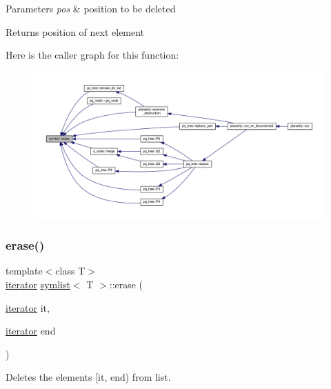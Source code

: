 \begin{DoxyParams}{Parameters}
{\em pos} & position to be deleted\\
\hline
\end{DoxyParams}
\begin{DoxyReturn}{Returns}
position of next element 
\end{DoxyReturn}
Here is the caller graph for this function\+:\nopagebreak
\begin{figure}[H]
\begin{center}
\leavevmode
\includegraphics[width=350pt]{classsymlist_a75fc1fc7db7b20cc430ddb8577608904_icgraph}
\end{center}
\end{figure}
\mbox{\label{classsymlist_a53128defa9aedb016affcfa27bf201da}} 
\subsubsection{\texorpdfstring{erase()}{erase()}\hspace{0.1cm}{\footnotesize\ttfamily [2/2]}}
{\footnotesize\ttfamily template$<$class T$>$ \\
\mbox{\hyperlink{classsymlist_a66045fbe3d98975e5537092ede8b50df}{iterator}} \mbox{\hyperlink{classsymlist}{symlist}}$<$ T $>$\+::erase (\begin{DoxyParamCaption}\item[{\mbox{\hyperlink{classsymlist_a66045fbe3d98975e5537092ede8b50df}{iterator}}}]{it,  }\item[{\mbox{\hyperlink{classsymlist_a66045fbe3d98975e5537092ede8b50df}{iterator}}}]{end }\end{DoxyParamCaption})}



Deletes the elements {\ttfamily \mbox{[}it, end)} from list. 


